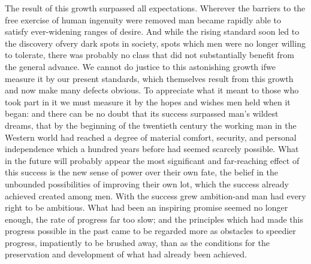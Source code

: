 \documentclass[11pt,openany]{book}
\begin{document}
The result of this growth surpassed all expectations. Wherever the barriers to the free exercise of human ingenuity were removed man became rapidly able to satisfy ever-widening ranges of desire. And while the rising standard soon led to the discovery ofvery dark spots in society, spots which men were no longer willing to tolerate, there was probably no class that did not substantially benefit from the general advance. We cannot do justice to this astonishing growth ifwe measure it by our present standards, which themselves result from this growth and now make many defects obvious. To appreciate what it meant to those who took part in it we must measure it by the hopes and wishes men held when it began: and there can be no doubt that its success surpassed man's wildest dreams, that by the beginning of the twentieth century the working man in the Western world had reached a degree of material comfort, security, and personal independence which a hundred years before had seemed scarcely possible. What in the future will probably appear the most significant and far-reaching effect of this success is the new sense of power over their own fate, the belief in the unbounded possibilities of improving their own lot, which the success already achieved created among men. With the success grew ambition-and man had every right to be ambitious. What had been an inspiring promise seemed no longer enough, the rate of progress far too slow; and the principles which had made this progress possible in the past came to be regarded more as obstacles to speedier progress, impatiently to be brushed away, than as the conditions for the preservation and development of what had already been achieved.

\begin{center}\textasteriskcentered\hspace{0.9em}\textasteriskcentered\hspace{0.9em}\textasteriskcentered\end{center}

\begin{center}\textasteriskcentered\hspace{0.9em}\textasteriskcentered\hspace{0.9em}\textasteriskcentered\end{center}

\begin{center}\textasteriskcentered\hspace{0.9em}\textasteriskcentered\hspace{0.9em}\textasteriskcentered\end{center}
\end{document}
